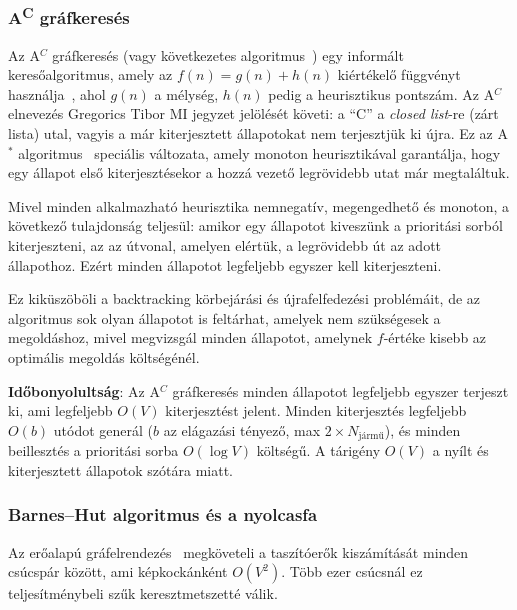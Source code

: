 \subsubsection{A\textsuperscript{C} gráfkeresés}
\label{sec:graphsearch}

Az A$^C$ gráfkeresés (vagy következetes algoritmus~\cite[4.4 fejezet]{gregorics_2006_bevezetes}) egy informált keresőalgoritmus, amely az $f(n) = g(n) + h(n)$ kiértékelő függvényt használja~\cite[16.~oldal]{gregorics_grafker}, ahol $g(n)$ a mélység, $h(n)$ pedig a heurisztikus pontszám. Az A$^C$ elnevezés Gregorics Tibor MI jegyzet jelölését követi: a \enquote{C} a \emph{closed list}-re (zárt lista) utal, vagyis a már kiterjesztett állapotokat nem terjesztjük ki újra. Ez az A$^*$ algoritmus~\cite{hart1968astar} speciális változata, amely monoton heurisztikával garantálja, hogy egy állapot első kiterjesztésekor a hozzá vezető legrövidebb utat már megtaláltuk.

Mivel minden alkalmazható heurisztika nemnegatív, megengedhető és monoton, a következő tulajdonság teljesül: amikor egy állapotot kiveszünk a prioritási sorból kiterjeszteni, az az útvonal, amelyen elértük, a legrövidebb út az adott állapothoz. Ezért minden állapotot legfeljebb egyszer kell kiterjeszteni.~\cite[16.~oldal]{gregorics_grafker}

Ez kiküszöböli a backtracking körbejárási és újrafelfedezési problémáit, de az algoritmus sok olyan állapotot is feltárhat, amelyek nem szükségesek a megoldáshoz, mivel megvizsgál minden állapotot, amelynek $f$-értéke kisebb az optimális megoldás költségénél.

\textbf{Időbonyolultság}: Az A$^C$ gráfkeresés minden állapotot legfeljebb egyszer terjeszt ki, ami legfeljebb $O(V)$ kiterjesztést jelent. Minden kiterjesztés legfeljebb $O(b)$ utódot generál ($b$ az elágazási tényező, max $2 \times N_{\text{jármű}}$), és minden beillesztés a prioritási sorba $O(\log V)$ költségű. A tárigény $O(V)$ a nyílt és kiterjesztett állapotok szótára miatt.

\subsubsection{Barnes–Hut algoritmus és a nyolcasfa}
\label{sec:barneshut}

Az erőalapú gráfelrendezés~\cite{fruchterman1991graph} megköveteli a taszítóerők kiszámítását minden csúcspár között, ami képkockánként $O(V^2)$. Több ezer csúcsnál ez teljesítménybeli szűk keresztmetszetté válik.

